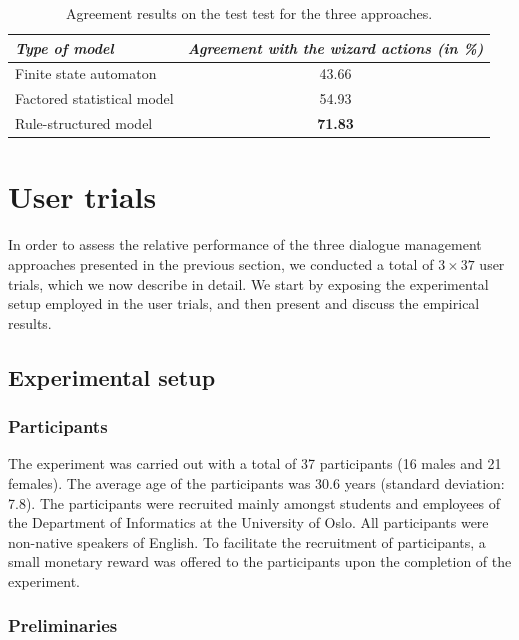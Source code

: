 \begin{table}[h]
\begin{center}
\begin{tabular}{|l|c|} \hline
\textit{Type of model} & \textit{Agreement with the wizard actions (in \%) } \\ \hline \hline
Finite state automaton & 43.66 \\ \hline
Factored statistical model & 54.93 \\ \hline
Rule-structured model & \textbf{71.83} \\ \hline
\end{tabular}
\end{center}
\vspace{-2mm}
\caption{Agreement results on the test test for the three approaches.}
\vspace{-2mm}
\label{table:learning-exp3}
\end{table}

\section{User trials}

In order to assess the relative performance of the three dialogue management approaches presented in the previous section, we conducted a total of $3 \times 37$ user trials, which we now describe in detail. We start by exposing the experimental setup employed in the user trials, and then present and discuss the empirical results. 

\subsection{Experimental setup}

\subsubsection*{Participants}

The experiment was carried out with a total of 37 participants (16 males and 21 females).  The average age of the participants was 30.6 years (standard deviation: 7.8). The participants were recruited mainly amongst students and employees of the Department of Informatics at the University of Oslo. All participants were non-native speakers of English. To facilitate the recruitment of participants, a small monetary reward was offered to the participants upon the completion of the experiment. 

\subsubsection*{Preliminaries}

